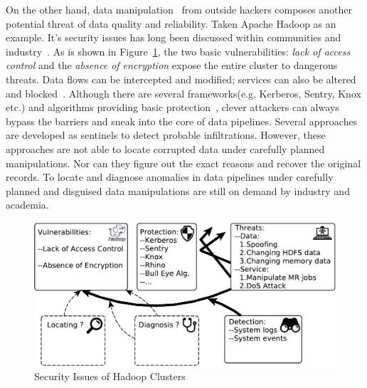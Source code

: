 \documentclass[a4paper]{IEEEtran}
\begin{document}
		On the other hand, data manipulation~\autocite{dataManipulation} from outside hackers composes another potential threat of data quality and reliability. Taken Apache Hadoop as an example. It's security issues has long been discussed within communities and industry~\autocite{sharif2015current,terzi2015survey,jam2014survey,sharma2014securing}. As is shown in Figure~\ref{fig:hadoop-security}, the two basic vulnerabilities: \textit{lack of access control} and the \textit{absence of encryption} expose the entire cluster to dangerous threats. Data flows can be intercepted and modified; services can also be altered and blocked~\autocite{huang2014denial}. Although there are several frameworks(e.g. Kerberos, Sentry, Knox etc.) and algorithms providing basic protection~\autocite{zheng2017towards,sikdar2017spatio,xu2016high,yu2015enhancing,cohen2014towards}, clever attackers can always bypass the barriers and sneak into the core of data pipelines. Several approaches are developed as sentinels to detect probable infiltrations. However, these approaches are not able to locate corrupted data under carefully planned manipulations. Nor can they figure out the exact reasons and recover the original records. To locate and diagnose anomalies in data pipelines under carefully planned and disguised data manipulations are still on demand by industry and academia.
		
		\begin{figure}[!t]
			\includegraphics[width=\linewidth]{fig/HadoopSecurity}
			\caption{Security Issues of Hadoop Clusters}
			\label{fig:hadoop-security}
		\end{figure}
\end{document}
